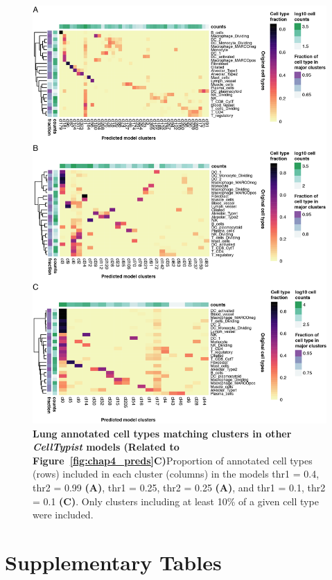 \begin{figure}[ht!] 
\centering
\includegraphics[scale=0.83]{Appendix3/Figs/appB_otherCtFrac_lung.png} %
\caption[Lung annotated cell types matching clusters in other \textit{CellTypist} models]{\textbf{Lung annotated cell types matching clusters in other \textit{CellTypist} models (Related to Figure~\ref{fig:chap4_preds}C)}\newline Proportion of annotated cell types (rows) included in each cluster (columns) in the models thr1 = 0.4, thr2 = 0.99 \textbf{(A)}, thr1 = 0.25, thr2 = 0.25 \textbf{(A)}, and thr1 = 0.1, thr2 = 0.1 \textbf{(C)}. Only clusters including at least 10\% of a given cell type were included.}
\label{fig:appB_otherct}
\end{figure}


\section{Supplementary Tables}
\label{sectionC1.2}

